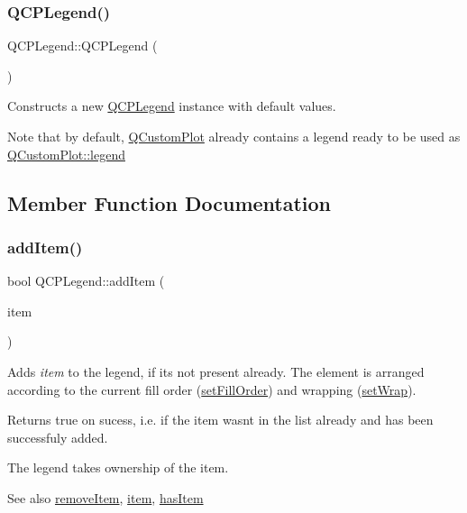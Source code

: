 \subsubsection{\texorpdfstring{Q\+C\+P\+Legend()}{QCPLegend()}}
{\footnotesize\ttfamily Q\+C\+P\+Legend\+::\+Q\+C\+P\+Legend (\begin{DoxyParamCaption}{ }\end{DoxyParamCaption})\hspace{0.3cm}{\ttfamily [explicit]}}

Constructs a new \hyperlink{class_q_c_p_legend}{Q\+C\+P\+Legend} instance with default values.

Note that by default, \hyperlink{class_q_custom_plot}{Q\+Custom\+Plot} already contains a legend ready to be used as \hyperlink{class_q_custom_plot_a4eadcd237dc6a09938b68b16877fa6af}{Q\+Custom\+Plot\+::legend} 

\subsection{Member Function Documentation}
\mbox{\label{class_q_c_p_legend_a3ab274de52d2951faea45a6d975e6b3f}} 
\subsubsection{\texorpdfstring{add\+Item()}{addItem()}}
{\footnotesize\ttfamily bool Q\+C\+P\+Legend\+::add\+Item (\begin{DoxyParamCaption}\item[{\hyperlink{class_q_c_p_abstract_legend_item}{Q\+C\+P\+Abstract\+Legend\+Item} $\ast$}]{item }\end{DoxyParamCaption})}

Adds {\itshape item} to the legend, if it\textquotesingle{}s not present already. The element is arranged according to the current fill order (\hyperlink{class_q_c_p_layout_grid_affc2f3cfd22f28698c5b29b960d2a391}{set\+Fill\+Order}) and wrapping (\hyperlink{class_q_c_p_layout_grid_ab36af18d77e4428386d02970382ee598}{set\+Wrap}).

Returns true on sucess, i.\+e. if the item wasn\textquotesingle{}t in the list already and has been successfuly added.

The legend takes ownership of the item.

\begin{DoxySeeAlso}{See also}
\hyperlink{class_q_c_p_legend_ac91595c3eaa746fe6321d2eb952c63bb}{remove\+Item}, \hyperlink{class_q_c_p_legend_acfe9694c45104a3359d3806ed366fcf7}{item}, \hyperlink{class_q_c_p_legend_ad0f698e33db454a6c103b5206740e599}{has\+Item} 
\end{DoxySeeAlso}
\mbox{\label{class_q_c_p_legend_a24795c7250eb5214fcea16b7217b4dfb}} 
